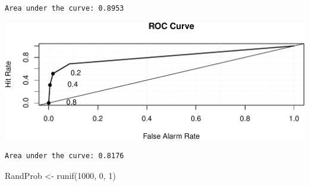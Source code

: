 \documentclass[
  letterpaper,
  DIV=11,
  numbers=noendperiod]{scrreprt}
\newenvironment{Shaded}{\begin{snugshade}}{\end{snugshade}}
\newcommand{\AttributeTok}[1]{\textcolor[rgb]{0.40,0.45,0.13}{#1}}
\newcommand{\DecValTok}[1]{\textcolor[rgb]{0.68,0.00,0.00}{#1}}
\newcommand{\FunctionTok}[1]{\textcolor[rgb]{0.28,0.35,0.67}{#1}}
\newcommand{\NormalTok}[1]{\textcolor[rgb]{0.00,0.23,0.31}{#1}}
\newcommand{\OtherTok}[1]{\textcolor[rgb]{0.00,0.23,0.31}{#1}}
\newcommand{\SpecialCharTok}[1]{\textcolor[rgb]{0.37,0.37,0.37}{#1}}
\begin{document}
\begin{verbatim}
Area under the curve: 0.8953
\end{verbatim}

\begin{Shaded}
\end{Shaded}

\includegraphics{Ch7_files/figure-pdf/unnamed-chunk-114-1.pdf}

\begin{Shaded}
\end{Shaded}

\begin{verbatim}
Area under the curve: 0.8176
\end{verbatim}

\begin{Shaded}
\begin{Highlighting}[]
\NormalTok{RandProb }\OtherTok{\textless{}{-}} \FunctionTok{runif}\NormalTok{(}\DecValTok{1000}\NormalTok{, }\DecValTok{0}\NormalTok{, }\DecValTok{1}\NormalTok{)}
\end{Highlighting}
\end{Shaded}

\begin{Shaded}
\end{Shaded}
\end{document}
